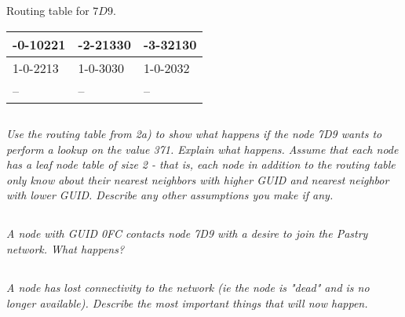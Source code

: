 \documentclass{article}
\newcommand{\question}[1]{\subsection{}\textit{#1}\bigskip}
\begin{document}
Routing table for $7D9$.
\begin{table}[ht!]
    \begin{center}
    \begin{tabular}{| l | l | l |}
    \hline
    -0-10221        & -2-21330      & -3-32130  \\
    \hline
    1-0-2213        & 1-0-3030      & 1-0-2032  \\
    \hline
    --              & --            & --        \\
    \hline
    \end{tabular}
    \end{center}
\end{table}


\question{Use the routing table from 2a) to show what happens if the node 7D9 wants to perform a lookup on the value 371. Explain what happens. Assume that each node has a leaf node table of size 2 - that is, each node in addition to the routing table only know about their nearest neighbors with higher GUID and nearest neighbor with lower GUID. Describe any other assumptions you make if any.}

\question{A node with GUID 0FC contacts node 7D9 with a desire to join the Pastry network. What happens?}

\question{A node has lost connectivity to the network (ie the node is "dead" and is no longer available). Describe the most important things that will now happen.}
\end{document}
